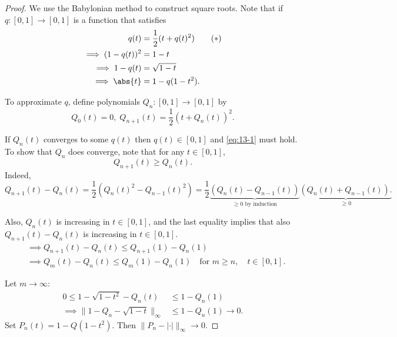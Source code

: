 \documentclass{article}
\begin{document}
\begin{proof}
    We use the Babylonian method to construct square roots.
    Note that if $q : [0, 1] \to [0, 1]$ is a function that satisfies
    \begin{align*}
        q(t) &= \frac{1}{2}(t + q(t)^2) \tag{$*$} \label{eq:13-1} \\
        \implies (1-q(t))^2 &= 1-t \\
        \implies 1 - q(t) &= \sqrt{1 - t} \\
        \implies \abs{t} &= 1 - q(1-t^2).
    \end{align*}

    To approximate $q$, define polynomials $Q_n : [0, 1] \to [0, 1]$ by
    \begin{equation*}
        Q_0(t) = 0, \; Q_{n+1}(t) = \frac{1}{2}(t + Q_n(t))^2.
    \end{equation*}

    If $Q_n(t)$ converges to some $q(t)$ then $q(t) \in [0, 1]$ and \eqref{eq:13-1} must hold.
    To show that $Q_n$ does converge, note that for any $t \in [0, 1]$,
    \begin{equation*}
        Q_{n+1}(t) \geq Q_n(t).
    \end{equation*}
    Indeed,
    \begin{equation*}
        Q_{n+1}(t) - Q_n(t) = \frac{1}{2} \left(Q_n(t)^2 - Q_{n-1}(t)^2\right) = \frac{1}{2}\underbrace{(Q_n(t) - Q_{n-1}(t))}_{\geq 0 \text{ by induction}} \underbrace{(Q_n(t) + Q_{n-1}(t)).}_{\geq 0}
    \end{equation*}

    Also, $Q_n(t)$ is increasing in $t \in [0, 1]$, and the last equality implies that also $Q_{n+1}(t) - Q_n(t)$ is increasing in $t \in [0, 1]$.
    \begin{align*}
        &\implies Q_{n+1}(t) - Q_n(t) \leq Q_{n+1}(1) - Q_n(1) \\
        &\implies Q_m(t) - Q_n(t) \leq Q_m(1) - Q_n(1) \quad \text{for } m \geq n, \quad t \in [0, 1].
    \end{align*}

    Let $m \to \infty$:
    \begin{align*}
        0 \leq 1 - \sqrt{1 - t^2} - Q_n(t) &\leq 1 - Q_n(1) \\
        \implies \|1 - Q_n - \sqrt{1-t}\|_\infty &\leq 1 - Q_n(1) \to 0.
    \end{align*}
    Set $P_n(t) = 1 - Q(1-t^2)$. Then $\|P_n - |\cdot|\|_\infty \to 0$.
\end{proof}
\end{document}
